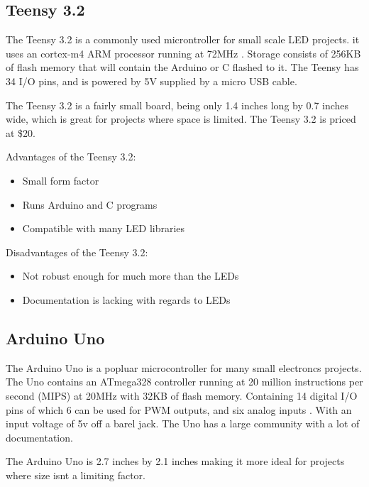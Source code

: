 \documentclass[onecolumn, draftclsnofoot,10pt, compsoc]{IEEEtran}
\begin{document}
		\subsection{Teensy 3.2}
		The Teensy 3.2 is a commonly used microntroller for small scale LED projects.
		it uses an cortex-m4 ARM processor running at 72MHz \cite[Pg 7]{K20}. Storage consists
		of 256KB of flash memory that will contain the Arduino or C flashed to it.
		The Teensy has 34 I/O pins, and is powered by 5V supplied by a micro USB
		cable.

		\vspace{5mm}
		\noindent The Teensy 3.2 is a fairly small board, being only 1.4 inches long
		by 0.7 inches wide, which is great for projects where space is limited. The
		Teensy 3.2 is priced at \$20.

		\vspace{5mm}
		\noindent Advantages of the Teensy 3.2:
		\begin{itemize}
			\item Small form factor
			\item Runs Arduino and C programs
			\item Compatible with many LED libraries
		\end{itemize}
		Disadvantages of the Teensy 3.2:
		\begin{itemize}
			\item Not robust enough for much more than the LEDs
			\item Documentation is lacking with regards to LEDs
		\end{itemize}
		\subsection{Arduino Uno}

		\vspace{5mm}
		\noindent The Arduino Uno is a popluar microcontroller for many small electroncs
		projects. The Uno contains an ATmega328 controller running at 20 million
		instructions per second (MIPS) at 20MHz with 32KB of flash
		memory\cite[Pg 7]{atmel}. Containing 14 digital I/O pins of which 6
		can be used for PWM outputs, and six analog inputs \cite[Pg 7]{arduino}. With
		an input voltage of 5v off a barel jack. The Uno has a large community with
		a lot of documentation.

		\vspace{5mm}
		\noindent The Arduino Uno is 2.7 inches by 2.1 inches making it more ideal for
		projects where size isnt a limiting factor.
\end{document}

